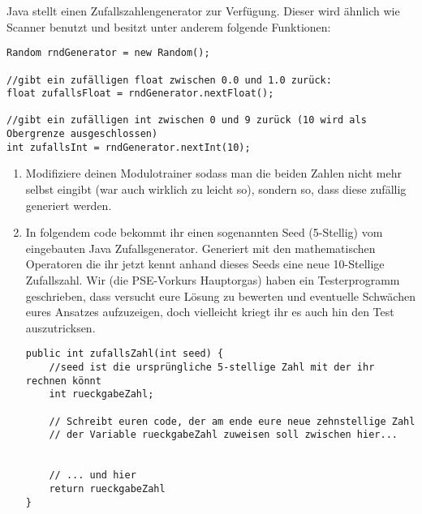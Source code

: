 \documentclass{../../sheet}
\begin{document}
\newpage
{}
Java stellt einen Zufallszahlengenerator zur Verfügung. Dieser wird ähnlich wie Scanner benutzt und besitzt unter anderem folgende Funktionen:

\begin{verbatim}
Random rndGenerator = new Random();

//gibt ein zufälligen float zwischen 0.0 und 1.0 zurück:
float zufallsFloat = rndGenerator.nextFloat();

//gibt ein zufälligen int zwischen 0 und 9 zurück (10 wird als Obergrenze ausgeschlossen)
int zufallsInt = rndGenerator.nextInt(10);
\end{verbatim}

\begin{enumerate}
    \item Modifiziere deinen Modulotrainer sodass man die beiden Zahlen nicht mehr selbst eingibt (war auch wirklich zu leicht so), sondern so, dass diese zufällig generiert werden. 
    \item In folgendem code bekommt ihr einen sogenannten Seed (5-Stellig) vom eingebauten Java Zufallsgenerator. Generiert mit den mathematischen Operatoren die ihr jetzt kennt anhand dieses Seeds eine neue 10-Stellige Zufallszahl. Wir (die PSE-Vorkurs Hauptorgas) haben ein Testerprogramm geschrieben, dass versucht eure Lösung zu bewerten und eventuelle Schwächen eures Ansatzes aufzuzeigen, doch vielleicht kriegt ihr es auch hin den Test auszutricksen.
    
    \begin{verbatim}
public int zufallsZahl(int seed) {
    //seed ist die ursprüngliche 5-stellige Zahl mit der ihr rechnen könnt
    int rueckgabeZahl;

    // Schreibt euren code, der am ende eure neue zehnstellige Zahl
    // der Variable rueckgabeZahl zuweisen soll zwischen hier...


    // ... und hier
    return rueckgabeZahl
}
    \end{verbatim}
\end{enumerate}
\end{document}

